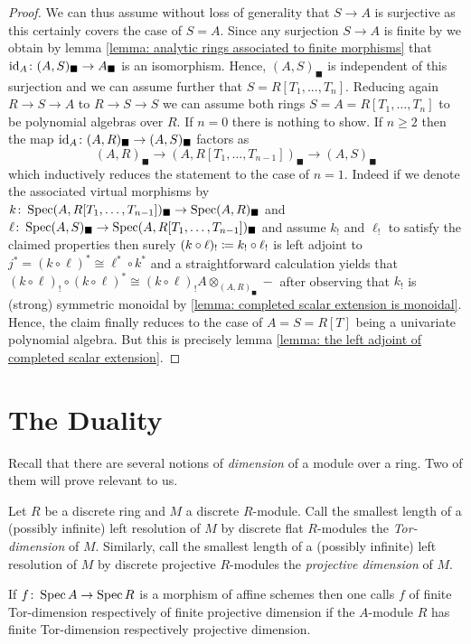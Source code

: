 \begin{proof}
	We can thus assume without loss of generality that $S\to A$ is surjective as this certainly covers the case of $S=A$. Since any surjection $S\to A$ is finite by \cite[\href{https://stacks.math.columbia.edu/tag/04VT}{Tag 04VT}]{stacks-project} we obtain by lemma \ref{lemma: analytic rings associated to finite morphisms} that $\mathrm{id}_A\colon (A, S)_\blacksquare \to A_\blacksquare$ is an isomorphism. Hence, $(A, S)_\blacksquare$ is independent of this surjection and we can assume further that $S = R[T_1, ..., T_n]$. Reducing again $R\to S\to A$ to $R\to S\to S$ we can assume both rings $S = A = R[T_1, \dots, T_n]$ to be polynomial algebras over $R$. If $n=0$ there is nothing to show. If $n\ge 2$ then the map $\mathrm{id}_A \colon (A, R)_\blacksquare \to (A, S)_\blacksquare$ factors as
	$$(A, R)_\blacksquare \to (A, R[T_1, \dots, T_{n-1}])_\blacksquare \to (A, S)_\blacksquare$$
	which inductively reduces the statement to the case of $n=1$. Indeed if we denote the associated virtual morphisms by $k\colon \operatorname{Spec}(A, R[T_1, \dots, T_{n-1}])_\blacksquare\to \operatorname{Spec} (A, R)_\blacksquare$ and $\ell\colon \operatorname{Spec} (A, S)_\blacksquare \to \operatorname{Spec} (A, R[T_1,\dots, T_{n-1}])_\blacksquare$ and assume $k_!$ and $\ell_!$ to satisfy the claimed properties then surely $(k\circ \ell)_!\coloneqq k_!\circ \ell_!$ is left adjoint to $j^\ast = (k\circ \ell)^\ast \cong \ell^\ast \circ k^\ast$ and a straightforward calculation yields that $(k\circ \ell)_!\circ (k\circ \ell)^\ast \cong (k\circ\ell)_! A \otimes_{(A, R)_\blacksquare} -$ after observing that $k_!$ is (strong) symmetric monoidal by \ref{lemma: completed scalar extension is monoidal}. Hence, the claim finally reduces to the case of $A = S = R[T]$ being a univariate polynomial algebra. But this is precisely lemma \ref{lemma: the left adjoint of completed scalar extension}.
\end{proof}


\section{The Duality}

Recall that there are several notions of \emph{dimension} of a module over a ring. Two of them will prove relevant to us.
\begin{definition} 
	Let $R$ be a discrete ring and $M$ a discrete $R$-module. Call the smallest length of a (possibly infinite) left resolution of $M$ by discrete flat $R$-modules the \emph{Tor-dimension} of $M$. Similarly, call the smallest length of a (possibly infinite) left resolution of $M$ by discrete projective $R$-modules the \emph{projective dimension} of $M$.
	
	If $f\colon \operatorname{Spec} A\to \operatorname{Spec} R$ is a morphism of affine schemes then one calls $f$ of finite Tor-dimension respectively of finite projective dimension if the $A$-module $R$ has finite Tor-dimension respectively projective dimension.
\end{definition}

